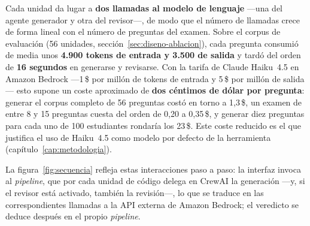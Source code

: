 Cada unidad da lugar a \textbf{dos llamadas al modelo de lenguaje} ---una del
agente generador y otra del revisor---, de modo que el número de llamadas crece
de forma lineal con el número de preguntas del examen. Sobre el corpus de
evaluación (56 unidades, sección~\ref{sec:diseno-ablacion}), cada pregunta
consumió de media unos \textbf{4.900 tokens de entrada y 3.500 de salida} y tardó
del orden de \textbf{16 segundos} en generarse y revisarse. Con la tarifa de
Claude Haiku~4.5 en Amazon Bedrock ---1\,\$ por millón de tokens de entrada y
5\,\$ por millón de salida--- esto supone un coste aproximado de
\textbf{dos céntimos de dólar por pregunta}: generar el corpus completo de 56
preguntas costó en torno a 1,3\,\$, un examen de entre 8 y 15 preguntas cuesta
del orden de 0,20 a 0,35\,\$, y generar diez preguntas para cada uno de 100
estudiantes rondaría los 23\,\$. Este coste reducido es el que justifica el uso
de Haiku~4.5 como modelo por defecto de la herramienta (capítulo~\ref{cap:metodologia}).

La figura~\ref{fig:secuencia} refleja estas interacciones paso a paso: la
interfaz invoca al \emph{pipeline}, que por cada unidad de código delega en
CrewAI la generación ---y, si el revisor está activado, también la revisión---,
lo que se traduce en las correspondientes llamadas a la API externa de Amazon
Bedrock; el veredicto se deduce después en el propio \emph{pipeline}.

